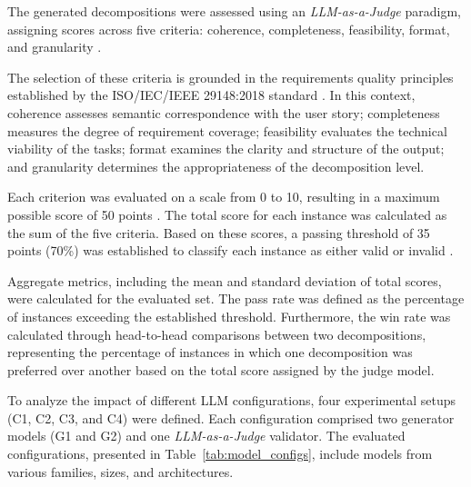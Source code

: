 \documentclass[pdflatex,sn-mathphys-num]{sn-jnl}%
\theoremstyle{thmstyleone}%
\theoremstyle{thmstyletwo}%
\theoremstyle{thmstylethree}%
\begin{document}
The generated decompositions were assessed using an \textit{LLM-as-a-Judge} paradigm, assigning scores across five criteria: coherence, completeness, feasibility, format, and granularity \cite{llm_judge_frontiers_2025}. 

The selection of these criteria is grounded in the requirements quality principles established by the ISO/IEC/IEEE 29148:2018 standard \cite{iso29148}. In this context, coherence assesses semantic correspondence with the user story; completeness measures the degree of requirement coverage; feasibility evaluates the technical viability of the tasks; format examines the clarity and structure of the output; and granularity determines the appropriateness of the decomposition level.

Each criterion was evaluated on a scale from 0 to 10, resulting in a maximum possible score of 50 points \cite{likert5to7range}. The total score for each instance was calculated as the sum of the five criteria. Based on these scores, a passing threshold of 35 points (70\%) was established to classify each instance as either valid or invalid \cite{threshold70}.

Aggregate metrics, including the mean and standard deviation of total scores, were calculated for the evaluated set. The pass rate was defined as the percentage of instances exceeding the established threshold. Furthermore, the win rate was calculated through head-to-head comparisons between two decompositions, representing the percentage of instances in which one decomposition was preferred over another based on the total score assigned by the judge model.

To analyze the impact of different LLM configurations, four experimental setups (C1, C2, C3, and C4) were defined. Each configuration comprised two generator models (G1 and G2) and one \textit{LLM-as-a-Judge} validator. The evaluated configurations, presented in Table~\ref{tab:model_configs}, include models from various families, sizes, and architectures.
\end{document}
